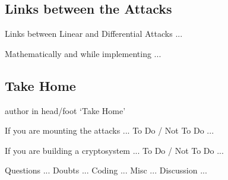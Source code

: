 \documentclass[9pt]{beamer}
\begin{document}
\subsection{Links between the Attacks}
\begin{frame}
Links between Linear and Differential Attacks ...

\end{frame}

\begin{frame}
Mathematically and while implementing ...

\end{frame}

\subsection{Take Home}
\begin{frame}
\begin{beamercolorbox}[ht=2.5ex,dp=1.125ex,center,rounded=true,shadow=true]{author in head/foot}
`Take Home'
\end{beamercolorbox}
\end{frame}

\begin{frame}
If you are mounting the attacks ... To Do / Not To Do ...

\end{frame}

\begin{frame}
If you are building a cryptosystem ... To Do / Not To Do ...

\end{frame}

\begin{frame}
Questions ... Doubts ... Coding ... Misc ... Discussion ...

\end{frame}
\end{document}
